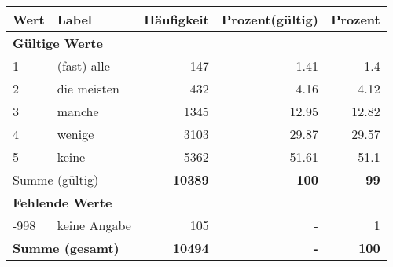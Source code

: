      \begin{longtable}{lXrrr}
     \toprule
     \textbf{Wert} & \textbf{Label} & \textbf{Häufigkeit} & \textbf{Prozent(gültig)} & \textbf{Prozent} \\
     \endhead
     \midrule
     \multicolumn{5}{l}{\textbf{Gültige Werte}}\\

     1 &
     \multicolumn{1}{X}{ (fast) alle   } &


       \num{147} &
       \num[round-mode=places,round-precision=2]{1.41} &
         \num[round-mode=places,round-precision=2]{1.4} \\

     2 &
     \multicolumn{1}{X}{ die meisten   } &


       \num{432} &
       \num[round-mode=places,round-precision=2]{4.16} &
         \num[round-mode=places,round-precision=2]{4.12} \\

     3 &
     \multicolumn{1}{X}{ manche   } &


       \num{1345} &
       \num[round-mode=places,round-precision=2]{12.95} &
         \num[round-mode=places,round-precision=2]{12.82} \\

     4 &
     \multicolumn{1}{X}{ wenige   } &


       \num{3103} &
       \num[round-mode=places,round-precision=2]{29.87} &
         \num[round-mode=places,round-precision=2]{29.57} \\

     5 &
     \multicolumn{1}{X}{ keine   } &


       \num{5362} &
       \num[round-mode=places,round-precision=2]{51.61} &
         \num[round-mode=places,round-precision=2]{51.1} \\
     \midrule
     \multicolumn{2}{l}{Summe (gültig)} &
       \textbf{\num{10389}} &
     \textbf{\num{100}} &
       \textbf{\num[round-mode=places,round-precision=2]{99}} \\
     \multicolumn{5}{l}{\textbf{Fehlende Werte}}\\
       -998 &
       keine Angabe &
         \num{105} &
        - &
         \num[round-mode=places,round-precision=2]{1} \\
     \midrule
     \multicolumn{2}{l}{\textbf{Summe (gesamt)}} &
          \textbf{\num{10494}} &
        \textbf{-} &
        \textbf{\num{100}} \\
     \bottomrule
     \end{longtable}
     
